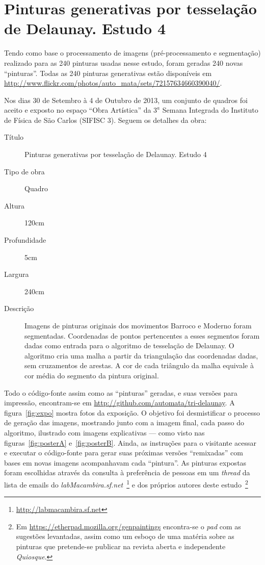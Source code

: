 \chapter{Pinturas generativas por tesselação de Delaunay. Estudo 4}
\label{ap:sifisc}

Tendo como base o processamento de imagens (pré-processamento e segmentação)
realizado para as 240 pinturas usadas nesse estudo, foram geradas 240 novas
``pinturas''. Todas as 240 pinturas generativas estão disponíveis em
\url{http://www.flickr.com/photos/auto_mata/sets/72157634660390040/}.

Nos dias 30 de Setembro à 4 de Outubro de 2013, um conjunto de quadros foi
aceito e exposto no espaço ``Obra Artística'' da $3^a$ Semana Integrada do
Instituto de Física de São Carlos (SIFISC 3). Seguem os detalhes da obra:

\begin{description}
  \item[Título] Pinturas generativas por tesselação de Delaunay. Estudo 4
  \item[Tipo de obra] Quadro
  \item[Altura] 120cm
  \item[Profundidade] 5cm
  \item[Largura] 240cm
  \item[Descrição] Imagens de pinturas originais dos movimentos Barroco e Moderno foram
    segmentadas. Coordenadas de pontos pertencentes a esses segmentos foram dadas
    como entrada para o algoritmo de tesselação de Delaunay. O algoritmo cria uma
    malha a partir da triangulação das coordenadas dadas, sem cruzamentos de
    arestas. A cor de cada triângulo da malha equivale à cor média do segmento da
    pintura original.
\end{description}

Todo o código-fonte assim como as ``pinturas'' geradas, e suas versões para
impressão, encontram-se em \url{http://github.com/automata/tri-delaunay}. A
figura~\ref{fig:expo} mostra fotos da exposição. O objetivo foi desmistificar o
processo de geração das imagens, mostrando junto com a imagem final, cada passo
do algoritmo, ilustrado com imagens explicativas --- como visto nas
figuras~\ref{fig:posterA} e~\ref{fig:posterB}. Ainda, as instruções para o
visitante acessar e executar o código-fonte para gerar suas próximas versões
``remixadas'' com bases em novas imagens acompanhavam cada ``pintura''. As
pinturas expostas foram escolhidas através da consulta à preferência de pessoas
em um \textit{thread} da lista de emails do
\emph{labMacambira.sf.net}~\footnote{\url{http://labmacambira.sf.net}} e dos
próprios autores deste estudo~\footnote{Em
  \url{https://etherpad.mozilla.org/genpaintings} encontra-se o \textit{pad} com
  as sugestões levantadas, assim como um esboço de uma matéria sobre as pinturas
  que pretende-se publicar na revista aberta e independente \textit{Quiosque}.}

